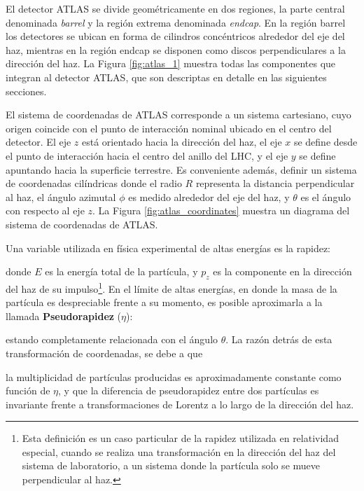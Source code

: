 El detector ATLAS se divide geométricamente en dos regiones, la parte central denominada \textit{barrel} y la región extrema denominada \textit{endcap}. En la región barrel los detectores se ubican en forma de cilindros concéntricos alrededor del eje del haz, mientras en la región endcap se disponen como discos perpendiculares a la dirección del haz. La Figura \ref{fig:atlas_1} muestra todas las componentes que integran al detector ATLAS, que son descriptas en detalle en las siguientes secciones.




El sistema de coordenadas de ATLAS corresponde a un sistema cartesiano, cuyo origen coincide con el punto de interacción nominal ubicado en el centro del detector. El eje $z$ está orientado hacia la dirección del haz, el eje $x$ se define desde el punto de interacción hacia el centro del anillo del LHC, y el eje $y$ se define apuntando hacia la superficie terrestre. Es conveniente además, definir un sistema de coordenadas cilíndricas donde el radio $R$ representa la distancia perpendicular al haz, el ángulo azimutal $\phi$ es medido alrededor del eje del haz, y $\theta$ es el ángulo con respecto al eje $z$. La Figura \ref{fig:atlas_coordinates} muestra un diagrama del sistema de coordenadas de ATLAS.



Una variable utilizada en física experimental de altas energías es la rapidez:



donde $E$ es la energía total de la partícula, y $p_{z}$ es la componente en la dirección del haz de su impulso\footnote{Esta definición es un caso particular de la rapidez utilizada en relatividad especial, cuando se realiza una transformación en la dirección del haz del sistema de laboratorio, a un sistema donde la partícula solo se mueve perpendicular al haz.}. En el límite de altas energías, en donde la masa de la partícula es despreciable frente a su momento, es posible aproximarla a la llamada \textbf{Pseudorapidez} ($\eta$):


estando completamente relacionada con el ángulo $\theta$. La razón detrás de esta transformación de coordenadas, se debe a que



 la multiplicidad de partículas producidas es aproximadamente constante como función de $\eta$, y que 
 la diferencia de pseudorapidez entre dos partículas es invariante frente a transformaciones de Lorentz a lo largo de la dirección del haz. 


